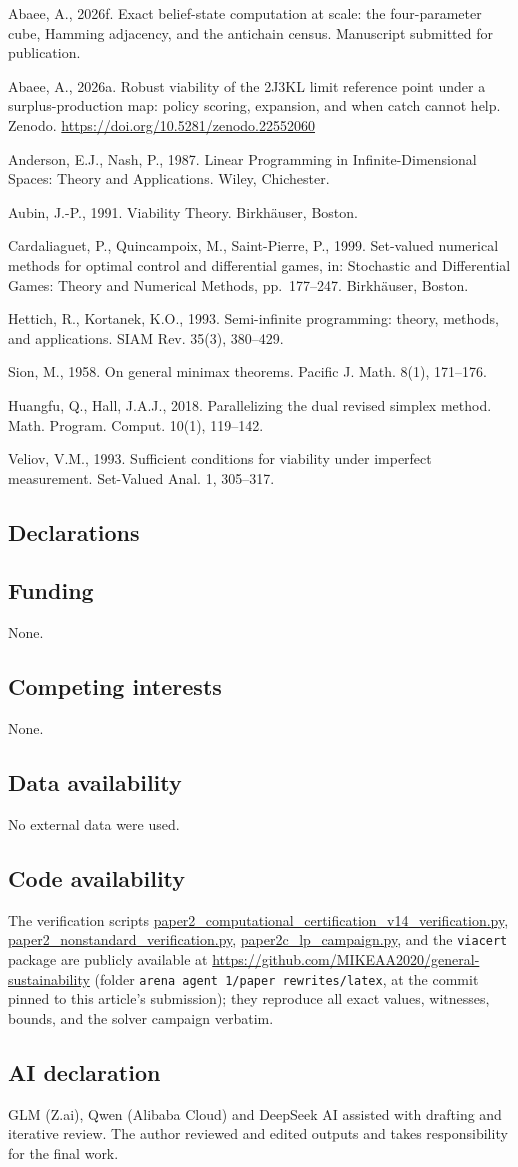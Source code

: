 \documentclass[10pt,twocolumn]{article}
\theoremstyle{plain}
\theoremstyle{definition}
\theoremstyle{remark}
\begin{document}
Abaee, A., 2026f. Exact belief-state computation at scale: the
four-parameter cube, Hamming adjacency, and the antichain census.
Manuscript submitted for publication.

Abaee, A., 2026a. Robust viability of the 2J3KL limit reference point
under a surplus-production map: policy scoring, expansion, and when catch
cannot help. Zenodo. \url{https://doi.org/10.5281/zenodo.22552060}

Anderson, E.J., Nash, P., 1987. Linear Programming in Infinite-Dimensional
Spaces: Theory and Applications. Wiley, Chichester.

Aubin, J.-P., 1991. Viability Theory. Birkh\"auser, Boston.

Cardaliaguet, P., Quincampoix, M., Saint-Pierre, P., 1999. Set-valued
numerical methods for optimal control and differential games, in:
Stochastic and Differential Games: Theory and Numerical Methods,
pp.~177--247. Birkh\"auser, Boston.

Hettich, R., Kortanek, K.O., 1993. Semi-infinite programming: theory,
methods, and applications. SIAM Rev. 35(3), 380--429.

Sion, M., 1958. On general minimax theorems. Pacific J. Math. 8(1),
171--176.

Huangfu, Q., Hall, J.A.J., 2018. Parallelizing the dual revised simplex
method. Math. Program. Comput. 10(1), 119--142.

Veliov, V.M., 1993. Sufficient conditions for viability under imperfect
measurement. Set-Valued Anal. 1, 305--317.

\subsection*{Declarations}

\subsection*{Funding}
None.

\subsection*{Competing interests}
None.

\subsection*{Data availability}
No external data were used.

\subsection*{Code availability}
The verification scripts
\url{paper2_computational_certification_v14_verification.py},
\url{paper2_nonstandard_verification.py},
\url{paper2c_lp_campaign.py}, and the \texttt{viacert} package are publicly
available at \url{https://github.com/MIKEAA2020/general-sustainability}
(folder \texttt{arena agent 1/paper rewrites/latex}, at the commit
pinned to this article's submission); they reproduce all exact values,
witnesses, bounds, and the solver campaign verbatim.

\subsection*{AI declaration}
GLM (Z.ai), Qwen (Alibaba Cloud) and DeepSeek AI assisted with drafting
and iterative review. The author reviewed and edited outputs and takes
responsibility for the final work.
\end{document}
